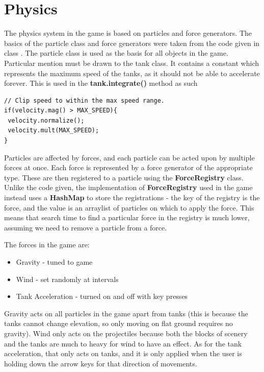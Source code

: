 \documentclass[12pt]{article}
\begin{document}
\section{Physics}
The physics system in the game is based on particles and force generators. The basics of the particle class and force generators were taken from the code given in class \cite{code}. The particle class is used as the basis for all objects in the game. Particular mention must be drawn to the tank class. It contains a constant which represents the maximum speed of the tanks, as it should not be able to accelerate forever. This is used in the \textbf{tank.integrate()} method as such
\begin{lstlisting}
// Clip speed to within the max speed range.
if(velocity.mag() > MAX_SPEED){
 velocity.normalize();
 velocity.mult(MAX_SPEED);
}
\end{lstlisting}
\par
Particles are affected by forces, and each particle can be acted upon by multiple forces at once. Each force is represented by a force generator of the appropriate type. These are then registered to a particle using the \textbf{ForceRegistry} class. Unlike the code given, the implementation of \textbf{ForceRegistry} used in the game instead uses a \textbf{HashMap} to store the registrations - the key of the registry is the force, and the value is an arraylist of particles on which to apply the force. This means that search time to find a particular force in the registry is much lower, assuming we need to remove a particle from a force.
\par 
The forces in the game are:
\begin{itemize}
\item Gravity - tuned to game
\item Wind - set randomly at intervals
\item Tank Acceleration - turned on and off with key presses
\end{itemize}
Gravity acts on all particles in the game apart from tanks (this is because the tanks cannot change elevation, so only moving on flat ground requires no gravity). Wind only acts on the projectiles because both the blocks of scenery and the tanks are much to heavy for wind to have an effect. As for the tank acceleration, that only acts on tanks, and it is only applied when the user is holding down the arrow keys for that direction of movements.
\par 
\end{document}
